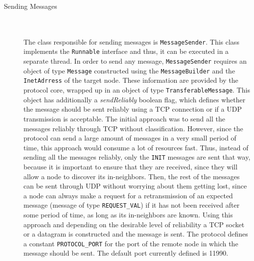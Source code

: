 \documentclass[a4paper,11pt,twoside]{report}
\newcommand{\classname}[1]{\texttt{#1}}
\begin{document}
\begin{description}
\item[Sending Messages] \hfill \\\\
The class responsible for sending messages is \classname{MessageSender}. This class implements the \classname{Runnable} interface and thus, it can be executed in a separate thread. In order to send any message, \classname{MessageSender} requires an object of type \classname{Message} constructed using the \classname{MessageBuilder} and the \classname{InetAdrress} of the target node. These information are provided by the protocol core, wrapped up in an object of type \classname{TransferableMessage}. This object has additionally a \textit{sendReliably} boolean flag, which defines whether the message should be sent reliably using a TCP connection or if a UDP transmission is acceptable. The initial approach was to send all the messages reliably through TCP without classification. However, since the protocol can send a large amount of messages in a very small period of time, this approach would consume a lot of resources fast. Thus, instead of sending all the messages reliably, only the \classname{INIT} messages are sent that way, because it is important to ensure that they are received, since they will allow a node to discover its in-neighbors. Then, the rest of the messages can be sent through UDP without worrying about them getting lost, since a node can always make a request for a retransmission of an expected message (message of type \classname{REQUEST\_VAL}) if it has not been received after some period of time, as long as its in-neighbors are known. Using this approach and depending on the desirable level of reliability a TCP socket or a datagram is constructed and the message is sent. The protocol defines a constant \classname{PROTOCOL\_PORT} for the port of the remote node in which the message should be sent. The default port currently defined is 11990. \\


\end{description}
\end{document}
